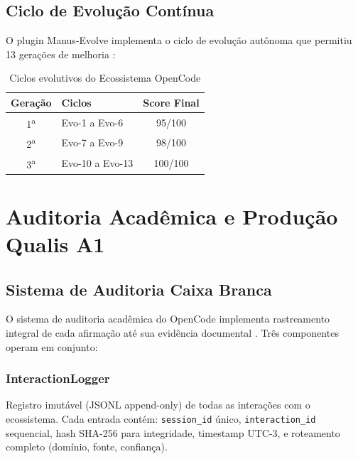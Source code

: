 \documentclass[12pt,a4paper,sumario=tradicional]{abntex2}
\begin{document}
\section{Ciclo de Evolução Contínua}

O plugin Manus-Evolve implementa o ciclo de evolução autônoma que permitiu 13 gerações de melhoria \cite{kodumagulla2026engineering}:

\begin{table}[H]
\centering
\caption{Ciclos evolutivos do Ecossistema OpenCode}
\label{tab:evolution}
\begin{tabular}{@{}clc@{}}
\toprule
\textbf{Geração} & \textbf{Ciclos} & \textbf{Score Final} \\
\midrule
1\textsuperscript{a} & Evo-1 a Evo-6  & 95/100 \\
2\textsuperscript{a} & Evo-7 a Evo-9  & 98/100 \\
3\textsuperscript{a} & Evo-10 a Evo-13 & 100/100 \\
\bottomrule
\end{tabular}
\end{table}

\chapter{Auditoria Acadêmica e Produção Qualis A1}

\section{Sistema de Auditoria Caixa Branca}

O sistema de auditoria acadêmica do OpenCode implementa rastreamento integral de cada afirmação até sua evidência documental \cite{pudasaini2024survey}. Três componentes operam em conjunto:

\subsection{InteractionLogger}

Registro imutável (JSONL append-only) de todas as interações com o ecossistema. Cada entrada contém: \texttt{session\_id} único, \texttt{interaction\_id} sequencial, hash SHA-256 para integridade, timestamp UTC-3, e roteamento completo (domínio, fonte, confiança).
\end{document}
